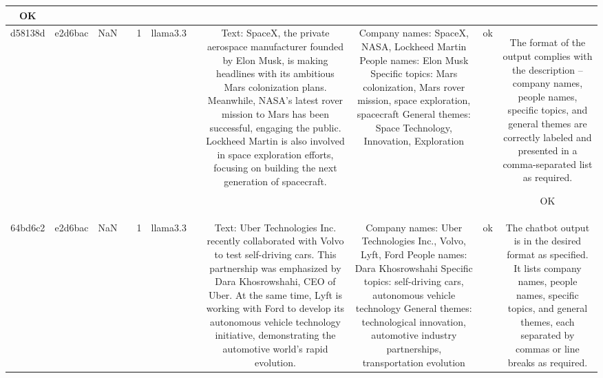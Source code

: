 \begin{table}[h!]
\begin{tabular}{|c|c|c|c|c|c|c|c|c|c|c|}
OK\\
\hline
d58138d & e2d6bac & NaN &  & 1 & llama3.3 &  & Text: SpaceX, the private aerospace manufacturer founded by Elon Musk, is making headlines with its ambitious Mars colonization plans. Meanwhile, NASA's latest rover mission to Mars has been successful, engaging the public. Lockheed Martin is also involved in space exploration efforts, focusing on building the next generation of spacecraft. & Company names: SpaceX, NASA, Lockheed Martin
People names: Elon Musk
Specific topics: Mars colonization, Mars rover mission, space exploration, spacecraft
General themes: Space Technology, Innovation, Exploration & ok & The format of the output complies with the description – company names, people names, specific topics, and general themes are correctly labeled and presented in a comma-separated list as required.

OK\\
\hline
64bd6c2 & e2d6bac & NaN &  & 1 & llama3.3 &  & Text: Uber Technologies Inc. recently collaborated with Volvo to test self-driving cars. This partnership was emphasized by Dara Khosrowshahi, CEO of Uber. At the same time, Lyft is working with Ford to develop its autonomous vehicle technology initiative, demonstrating the automotive world's rapid evolution. & Company names: Uber Technologies Inc., Volvo, Lyft, Ford
People names: Dara Khosrowshahi
Specific topics: self-driving cars, autonomous vehicle technology
General themes: technological innovation, automotive industry partnerships, transportation evolution & ok & The chatbot output is in the desired format as specified. It lists company names, people names, specific topics, and general themes, each separated by commas or line breaks as required.


\end{tabular}
\end{table}
